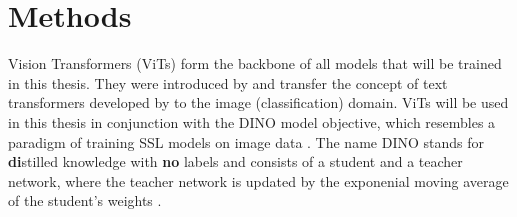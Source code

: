 \section{Methods}
Vision Transformers (ViTs) form the backbone of all models that will be trained in this thesis.
They were introduced by \citep{Dosovitskiy2020} and transfer the concept of text transformers developed by \citep{Vaswani2017} to the image (classification) domain.
ViTs will be used in this thesis in conjunction with the DINO model objective, which resembles a paradigm of training SSL models on image data \citep{Caron2021}.
The name DINO stands for \textbf{di}stilled knowledge with \textbf{no} labels and consists of a student and a teacher network, where the teacher network is updated by the exponenial moving average of the student's weights \citep{Caron2021}.

